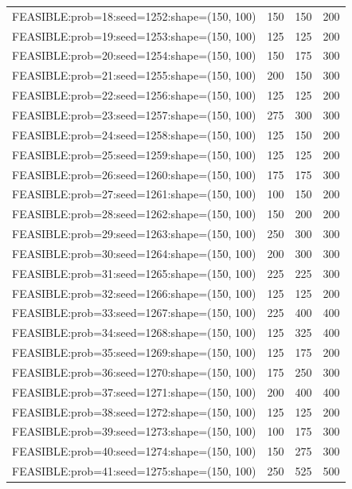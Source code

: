 \begin{longtable}{lccc}
FEASIBLE:prob=18:seed=1252:shape=(150, 100)  &  150 &   150 &    200 \\
FEASIBLE:prob=19:seed=1253:shape=(150, 100)  &  125 &   125 &    200 \\
FEASIBLE:prob=20:seed=1254:shape=(150, 100)  &  150 &   175 &    300 \\
FEASIBLE:prob=21:seed=1255:shape=(150, 100)  &  200 &   150 &    300 \\
FEASIBLE:prob=22:seed=1256:shape=(150, 100)  &  125 &   125 &    200 \\
FEASIBLE:prob=23:seed=1257:shape=(150, 100)  &  275 &   300 &    300 \\
FEASIBLE:prob=24:seed=1258:shape=(150, 100)  &  125 &   150 &    200 \\
FEASIBLE:prob=25:seed=1259:shape=(150, 100)  &  125 &   125 &    200 \\
FEASIBLE:prob=26:seed=1260:shape=(150, 100)  &  175 &   175 &    300 \\
FEASIBLE:prob=27:seed=1261:shape=(150, 100)  &  100 &   150 &    200 \\
FEASIBLE:prob=28:seed=1262:shape=(150, 100)  &  150 &   200 &    200 \\
FEASIBLE:prob=29:seed=1263:shape=(150, 100)  &  250 &   300 &    300 \\
FEASIBLE:prob=30:seed=1264:shape=(150, 100)  &  200 &   300 &    300 \\
FEASIBLE:prob=31:seed=1265:shape=(150, 100)  &  225 &   225 &    300 \\
FEASIBLE:prob=32:seed=1266:shape=(150, 100)  &  125 &   125 &    200 \\
FEASIBLE:prob=33:seed=1267:shape=(150, 100)  &  225 &   400 &    400 \\
FEASIBLE:prob=34:seed=1268:shape=(150, 100)  &  125 &   325 &    400 \\
FEASIBLE:prob=35:seed=1269:shape=(150, 100)  &  125 &   175 &    200 \\
FEASIBLE:prob=36:seed=1270:shape=(150, 100)  &  175 &   250 &    300 \\
FEASIBLE:prob=37:seed=1271:shape=(150, 100)  &  200 &   400 &    400 \\
FEASIBLE:prob=38:seed=1272:shape=(150, 100)  &  125 &   125 &    200 \\
FEASIBLE:prob=39:seed=1273:shape=(150, 100)  &  100 &   175 &    300 \\
FEASIBLE:prob=40:seed=1274:shape=(150, 100)  &  150 &   275 &    300 \\
FEASIBLE:prob=41:seed=1275:shape=(150, 100)  &  250 &   525 &    500 \\

\end{longtable}
